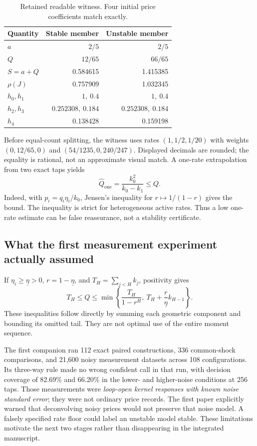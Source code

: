 \documentclass[11pt,a4paper]{article}
\theoremstyle{definition}
\theoremstyle{remark}
\begin{document}
\begin{table}[htbp]
\centering\small
\caption{Retained readable witness. Four initial price coefficients match exactly.}
\label{tab:retained_witness}
\begin{tabular}{lrr}\toprule
Quantity & Stable member & Unstable member\\\midrule
$a$ & $2/5$ & $2/5$\\
$Q$ & $12/65$ & $66/65$\\
$S=a+Q$ & 0.584615 & 1.415385\\
$\rho(J)$ & 0.757909 & 1.032345\\
$h_0,h_1$ & $1,\ 0.4$ & $1,\ 0.4$\\
$h_2,h_3$ & $0.252308,\ 0.184$ & $0.252308,\ 0.184$\\
$h_4$ & 0.138428 & 0.159198\\\bottomrule
\end{tabular}
\end{table}
Before equal-count splitting, the witness uses rates $(1,1/2,1/20)$ with weights $(0,12/65,0)$ and $(54/1235,0,240/247)$. Displayed decimals are rounded; the equality is rational, not an approximate visual match. A one-rate extrapolation from two exact taps yields
\[
 \widehat Q_{\mathrm{one}}=\frac{k_0^2}{k_0-k_1}\le Q.
\]
Indeed, with $p_i=q_i\eta_i/k_0$, Jensen's inequality for $r\mapsto1/(1-r)$ gives the bound. The inequality is strict for heterogeneous active rates. Thus a low one-rate estimate can be false reassurance, not a stability certificate.

\subsection{What the first measurement experiment actually assumed}
If $\eta_i\ge\underline\eta>0$, $r=1-\underline\eta$, and $T_H=\sum_{j<H}k_j$, positivity gives
\begin{equation}
 T_H\le Q\le\min\left\{\frac{T_H}{1-r^H},\ T_H+\frac{r}{\underline\eta}k_{H-1}\right\}.
 \label{eq:retained_tail}
\end{equation}
These inequalities follow directly by summing each geometric component and bounding its omitted tail. They are not optimal use of the entire moment sequence.

The first companion ran 112 exact paired constructions, 336 common-shock comparisons, and 21,600 noisy measurement datasets across 108 configurations. Its three-way rule made no wrong confident call in that run, with decision coverage of 82.69\% and 66.20\% in the lower- and higher-noise conditions at 256 taps. Those measurements were \emph{loop-open kernel responses with known noise standard error}; they were not ordinary price records. The first paper explicitly warned that deconvolving noisy prices would not preserve that noise model. A falsely specified rate floor could label an unstable model stable. These limitations motivate the next two stages rather than disappearing in the integrated manuscript.
\end{document}
